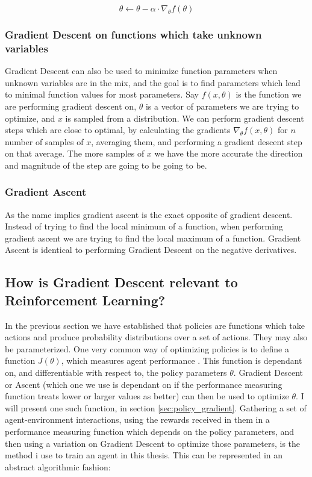\begin{equation}\label{Graident_Descent:basic_update_vector}
    \theta \leftarrow \theta - \alpha \cdot \nabla_\theta f(\theta)
\end{equation}

\subsubsection{Gradient Descent on functions which take unknown variables}\label{gd:random_var}
Gradient Descent can also be used to minimize function parameters when unknown variables are in the mix, and the goal is to find parameters which lead to minimal function values for most parameters. Say $f(x, \theta)$ is the function we are performing gradient descent on, $\theta$ is a vector of parameters we are trying to optimize, and $x$ is sampled from a distribution. We can perform gradient descent steps which are close to optimal, by calculating the gradients $\nabla_\theta f(x, \theta)$ for $n$ number of samples of $x$, averaging them, and performing a gradient descent step on that average. The more samples of $x$ we have the more accurate the direction and magnitude of the step are going to be going to be.

\subsubsection*{Gradient Ascent}\label{gd:gradient_ascent}
As the name implies gradient ascent is the exact opposite of gradient descent. Instead of trying to find the local minimum of a function, when performing gradient ascent we are trying to find the local maximum of a function. Gradient Ascent is identical to performing Gradient Descent on the negative derivatives. 

\subsection{How is Gradient Descent relevant to Reinforcement Learning?}\label{gd:relevance}
In the previous section we have established that policies are functions which take actions and produce probability distributions over a set of actions. They may also be parameterized. One very common way of optimizing policies is to define a function $J(\theta)$, which measures agent performance . This function is dependant on, and differentiable with respect to, the policy parameters $\theta$. Gradient Descent or Ascent (which one we use is dependant on if the performance measuring function treats lower or larger values as better) can then be used to optimize $\theta$. I will present one such function, in section \ref{sec:policy_gradient}. Gathering a set of agent-environment interactions, using the rewards received in them in a performance measuring function which depends on the policy parameters, and then using a variation on Gradient Descent to optimize those parameters, is the method i use to train an agent in this thesis. This can be represented in an abstract algorithmic fashion:

